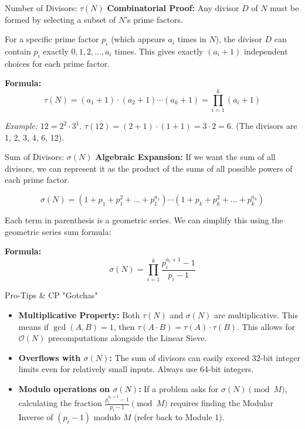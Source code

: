\documentclass[aspectratio=169]{beamer}
\begin{document}
\begin{frame}{Number of Divisors: $\tau(N)$}
    \textbf{Combinatorial Proof:}
    Any divisor $D$ of $N$ must be formed by selecting a subset of $N$'s prime factors. 
    
    For a specific prime factor $p_i$ (which appears $a_i$ times in $N$), the divisor $D$ can contain $p_i$ exactly $0, 1, 2, \dots, a_i$ times.
    This gives exactly $(a_i + 1)$ independent choices for each prime factor.
    
    \vspace{0.3cm}
    \textbf{Formula:}
    $$\tau(N) = (a_1 + 1) \cdot (a_2 + 1) \cdots (a_k + 1) = \prod_{i=1}^{k} (a_i + 1)$$
    
    \textit{Example:} $12 = 2^2 \cdot 3^1$. 
    $\tau(12) = (2 + 1) \cdot (1 + 1) = 3 \cdot 2 = 6$. 
    (The divisors are 1, 2, 3, 4, 6, 12).
\end{frame}

\begin{frame}{Sum of Divisors: $\sigma(N)$}
    \textbf{Algebraic Expansion:}
    If we want the sum of all divisors, we can represent it as the product of the sums of all possible powers of each prime factor.
    
    $$\sigma(N) = (1 + p_1 + p_1^2 + \dots + p_1^{a_1}) \cdots (1 + p_k + p_k^2 + \dots + p_k^{a_k})$$
    
    \vspace{0.3cm}
    Each term in parenthesis is a geometric series. We can simplify this using the geometric series sum formula:
    
    \textbf{Formula:}
    $$\sigma(N) = \prod_{i=1}^{k} \frac{p_i^{a_i+1} - 1}{p_i - 1}$$
\end{frame}

\begin{frame}{Pro-Tips \& CP "Gotchas"}
    \begin{itemize}
        \item \textbf{Multiplicative Property:} Both $\tau(N)$ and $\sigma(N)$ are multiplicative. This means if $\gcd(A, B) = 1$, then $\tau(A \cdot B) = \tau(A) \cdot \tau(B)$. This allows for $\mathcal{O}(N)$ precomputations alongside the Linear Sieve.
        \item \textbf{Overflows with $\sigma(N)$:} The sum of divisors can easily exceed 32-bit integer limits even for relatively small inputs. Always use 64-bit integers.
        \item \textbf{Modulo operations on $\sigma(N)$:} If a problem asks for $\sigma(N) \pmod M$, calculating the fraction $\frac{p_i^{a_i+1} - 1}{p_i - 1} \pmod M$ requires finding the Modular Inverse of $(p_i - 1)$ modulo $M$ (refer back to Module 1).
    \end{itemize}
\end{frame}
\end{document}
